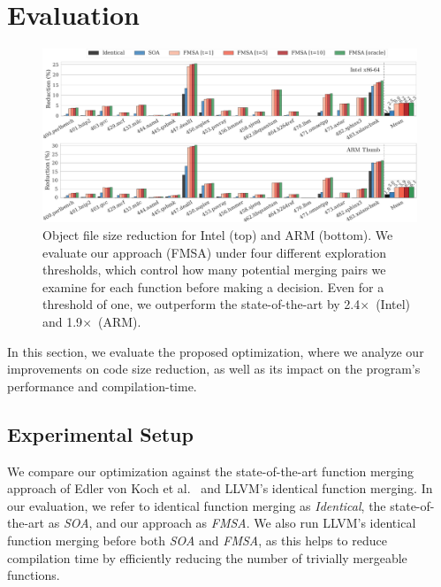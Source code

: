 \section{Evaluation}

\begin{figure}[t!]
  \centering
  \includegraphics[width=\linewidth]{figs/code-size-reduction-spec.pdf}
	\caption{Object file size reduction for Intel (top) and ARM (bottom). We evaluate our approach (FMSA) under four different exploration thresholds, which
      control how many potential merging pairs we examine for each function before making a decision. Even for a threshold of one, we outperform the state-of-the-art
	  by 2.4$\times$~(Intel) and 1.9$\times$~(ARM).}
  \label{fig:reduction-obj}
\end{figure}

In this section, we evaluate the proposed optimization, where we analyze our
improvements on code size reduction, as well as its impact on the program's
performance and compilation-time.

\subsection{Experimental Setup}
We compare our optimization against the state-of-the-art function merging approach of Edler von Koch et al.~\cite{edler14} and LLVM's identical
function merging. In our evaluation, we refer to identical function merging as \textit{Identical}, the state-of-the-art as \textit{SOA}, and our
approach as \textit{FMSA}.
We also run LLVM's identical function merging before both \textit{SOA} and \textit{FMSA}, as this helps to reduce
compilation time by efficiently reducing the number of trivially mergeable functions.

